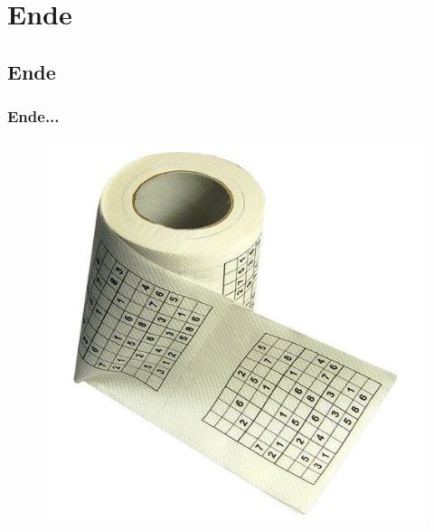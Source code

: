 \documentclass[accentcolor=tud6b,colorbacktitle,inverttitle,landscape,german,presentation,t]{tudbeamer}
\begin{document}
\section{Ende}
	\subsection{Ende}
		\begin{frame}
		\frametitle{Ende...}
		\begin{figure}[Hh]
		\includegraphics[width=\textwidth,height=\textheight,keepaspectratio]{./img/title.jpg}
		\end{figure}
		\end{frame}
\end{document}
